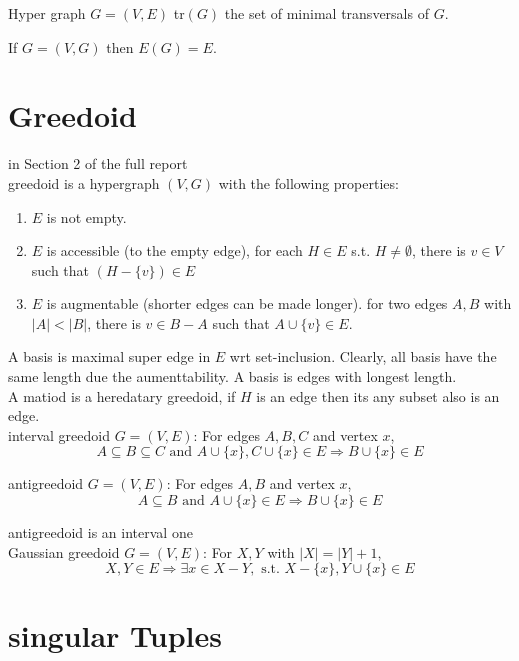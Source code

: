 \documentclass[12pt]{article}
\begin{document}
Hyper graph $G=(V,E)$ tr$(G)$ the set of minimal transversals of $G$.

If $G=(V, G)$ then $E(G)=E$.

\section{Greedoid}

in Section 2 of the full report\\

greedoid is a hypergraph $(V,G)$ with the following properties:

\begin{enumerate}
\item $E$ is not empty.

\item $E$ is accessible (to the empty edge), for each $H\in E$ s.t. $H\not=\emptyset$, there is $v\in V$ such that $(H-\{v\})\in E$ 

\item $E$ is augmentable (shorter edges can be made longer). for two edges $A,B$ with $|A|<|B|$, there is $v\in B-A$ such that $A\cup\{v\}\in E$.
\end{enumerate}


A basis is maximal super edge  in $E$ wrt set-inclusion. Clearly, all basis have the same length due the aumenttability. A basis is edges with longest length.\\


A matiod is a heredatary greedoid, if $H$ is an edge then its any subset also is an edge. \\


interval greedoid $G=(V,E)$: For edges $A,B,C$ and vertex $x$, $$A\subseteq B\subseteq C\mbox{ and }A\cup\{x\}, C\cup\{x\}\in E \Longrightarrow B\cup \{x\}\in E$$ 


antigreedoid $G=(V,E)$: For edges $A,B$ and vertex $x$, $$A\subseteq B\mbox{ and }A\cup\{x\}\in E \Longrightarrow B\cup \{x\}\in E$$

antigreedoid is an interval one\\

Gaussian greedoid $G=(V,E)$: For $X, Y$ with $|X|=|Y|+1$, 
$$X, Y\in E \Longrightarrow \exists x\in X-Y, \mbox{ s.t. }X-\{x\}, Y\cup\{x\}\in E$$


\section{singular Tuples}
\end{document}

